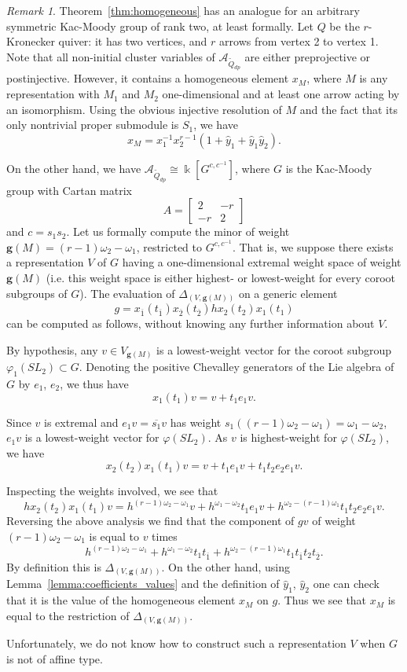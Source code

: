 \documentclass[12pt]{amsart}
\newcommand{\cA}{\mathcal{A}}
\newcommand{\kk}{\Bbbk}
\newcommand{\bfg}{\mathbf{g}}
\newcommand{\grep}{\bfg}
\newcommand{\ol}[1]{\overline{#1}}
\newcommand{\Qdp}{\widetilde{Q}_{dp}}
\newcommand{\Qrep}{M}
\theoremstyle{remark}
\newtheorem{remark}[theorem]{Remark}
\numberwithin{equation}{section}
\numberwithin{figure}{section}
\begin{document}
\begin{remark}\label{rmk:nonaffinehomelt}
  Theorem~\ref{thm:homogeneous} has an analogue for an arbitrary symmetric Kac-Moody group of rank two, at least formally.
  Let $Q$ be the $r$-Kronecker quiver: it has two vertices, and $r$ arrows from vertex 2 to vertex 1.
  Note that all non-initial cluster variables of $\cA_{\Qdp}$ are either preprojective or postinjective.
  However, it contains a homogeneous element $x_M$, where $M$ is any representation with $M_1$ and $M_2$ one-dimensional and at least one arrow acting by an isomorphism.
  Using the obvious injective resolution of $M$ and the fact that its only nontrivial proper submodule is $S_1$, we have
  \[
    x_M = x_1^{-1}x_2^{r-1}(1 + \hat{y}_1 + \hat{y}_1 \hat{y}_2).
  \]
  
  On the other hand, we have $\cA_{\Qdp} \cong \kk[G^{c,c^{-1}}]$, where $G$ is the Kac-Moody group with Cartan matrix 
  \[
    A = \begin{bmatrix} 2 & -r \\ -r & 2 \end{bmatrix}
  \]
  and $c = s_1 s_2$.
  Let us formally compute the minor of weight $\grep(\Qrep) = (r-1) \omega_2 - \omega_1$, restricted to $G^{c,c^{-1}}$. 
That is, we suppose there exists a representation $V$ of $G$ having a one-dimensional extremal weight space of weight $\grep(\Qrep)$ (i.e. this weight space is either highest- or lowest-weight for every coroot subgroups of $G$). The evaluation of $\Delta_{(V,\grep(M))}$ on a generic element
\[
g = x_{\ol{1}}(t_{\ol{1}}) x_{\ol{2}}(t_{\ol{2}})hx_2(t_2)x_1(t_1)
\]
can be computed as follows, without knowing any further information about $V$. 

By hypothesis, any $v \in V_{\grep(\Qrep)}$ is a lowest-weight vector for the coroot subgroup $\varphi_1(SL_2) \subset G$. Denoting the positive Chevalley generators of the Lie algebra of $G$ by $e_1$, $e_2$, we thus have
\[
x_1(t_1)v = v + t_1e_1v.
\]

Since $v$ is extremal and $e_1v = \ol{s_1}v$ has weight $s_1((r-1) \omega_2 - \omega_1) = \omega_1 - \omega_2$, $e_1v$ is a lowest-weight vector for $\varphi(SL_2)$. As $v$ is highest-weight for $\varphi(SL_2)$, we have
\[
x_2(t_2)x_1(t_1)v = v + t_1e_1v + t_1t_2e_2e_1v.
\]

Inspecting the weights involved, we see that
\[
hx_2(t_2)x_1(t_1)v = h^{(r-1) \omega_2 - \omega_1}v + h^{\omega_1-\omega_2}t_1e_1v + h^{\omega_2 - (r-1)\omega_1}t_1t_2e_2e_1v.
\]
Reversing the above analysis we find that the component of $gv$ of weight $(r-1)\omega_2 - \omega_1$ is equal to $v$ times
\[
h^{(r-1) \omega_2 - \omega_1} + h^{\omega_1-\omega_2}t_1t_{\ol{1}} + h^{\omega_2 - (r-1)\omega_1}t_1t_{\ol{1}}t_2t_{\ol{2}}.
\]
By definition this is $\Delta_{(V,\grep(M))}$. On the other hand, using Lemma~\ref{lemma:coefficients_values} and the definition of $\hat{y}_1$, $\hat{y}_2$ one can check that it is the value of the homogeneous element $x_M$ on $g$. Thus we see that $x_M$ is equal to the restriction of $\Delta_{(V,\grep(M))}$. 

Unfortunately, we do not know how to construct such a representation $V$ when $G$ is not of affine type.
\end{remark}



\end{document}
